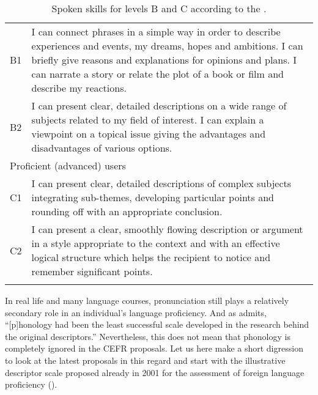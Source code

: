 \begin{table}
\begin{tabularx}{\textwidth}{lX}
      \lsptoprule
      \multicolumn{2}{l}{Independent (intermediate) users}\\\midrule
      B1 & I can connect phrases in a simple way in order to describe experiences and events, my dreams, hopes and ambitions. I can briefly give reasons and explanations for opinions and plans. I can narrate a story or relate the plot of a book or film and describe my reactions.\\
      B2 & I can present clear, detailed descriptions on a wide range of subjects related to my field of interest. I can explain a viewpoint on a topical issue giving the advantages and disadvantages of various options.\\\midrule
      \multicolumn{2}{l}{Proficient (advanced) users}\\\midrule
      C1 & I can present clear, detailed descriptions of complex subjects integrating sub-themes, developing particular points and rounding off with an appropriate conclusion.\\ 
      C2 & I can present a clear, smoothly flowing description or argument in a style appropriate to the context and with an effective logical structure which helps the recipient to notice and remember significant points.\\
      \lspbottomrule
  \end{tabularx}
\caption{Spoken skills for levels B and C according to the \citet{CEFR2018}.}
\label{tab:2.1}
\end{table}

In real life and many language courses, pronunciation still plays a relatively secondary role in an individual’s language proficiency. And as \citet[47]{CEFR2018} admits, “[p]honology had been the least successful scale developed in the research behind the original descriptors.” Nevertheless, this does not mean that phonology is completely ignored in the CEFR proposals. Let us here make a short digression to look at the latest proposals in this regard and start with the illustrative descriptor scale proposed already in 2001 for the assessment of foreign language proficiency ().

